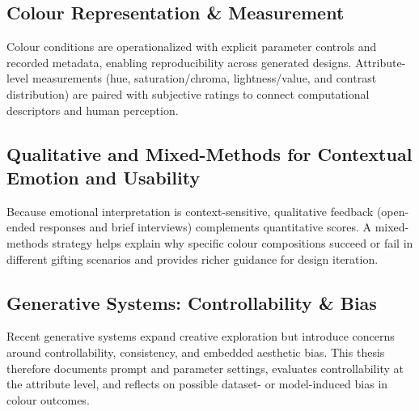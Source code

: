\subsection{Colour Representation \& Measurement}

Colour conditions are operationalized with explicit parameter controls and recorded metadata, enabling reproducibility across generated designs. Attribute-level measurements (hue, saturation/chroma, lightness/value, and contrast distribution) are paired with subjective ratings to connect computational descriptors and human perception.

\subsection{Qualitative and Mixed-Methods for Contextual Emotion and Usability}

Because emotional interpretation is context-sensitive, qualitative feedback (open-ended responses and brief interviews) complements quantitative scores. A mixed-methods strategy helps explain why specific colour compositions succeed or fail in different gifting scenarios and provides richer guidance for design iteration.

\subsection{Generative Systems: Controllability \& Bias}

Recent generative systems expand creative exploration but introduce concerns around controllability, consistency, and embedded aesthetic bias. This thesis therefore documents prompt and parameter settings, evaluates controllability at the attribute level, and reflects on possible dataset- or model-induced bias in colour outcomes.
